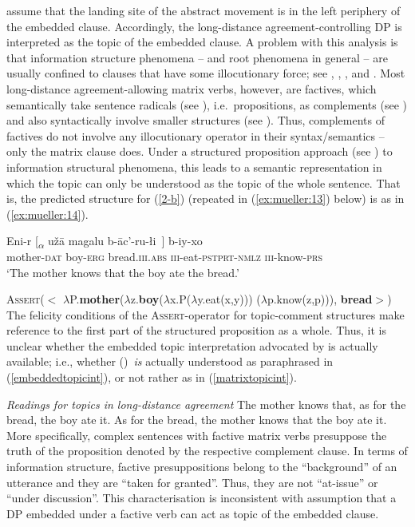 \documentclass[output=paper
,modfonts
,nonflat]{langsci/langscibook}
\begin{document}
\citet{PolinskyPotsdam:01} assume that the landing site of the
abstract movement is in the left periphery of the embedded
	clause. Accordingly, the long-distance agreement-controlling DP is
	interpreted as the topic of the embedded clause. A problem with this
	analysis is that information structure phenomena -- and root phenomena
	in general -- are usually confined to clauses that have some
	illocutionary force; see \citet{HooperThompson:73},
	\citet{Ebertetal08}, \citet{Krifkainprep}, and \citet{Maticetal14}. Most long-distance agreement-allowing
	matrix verbs, however, are factives, which semantically take sentence
	radicals (see \citealt{Stenius67}), i.e.~propositions, as complements (see \citealt{Krifka04})
	and also syntactically involve smaller
	structures (see \citealt{deCubaUrogdi10}). Thus, complements of
	factives do not involve any illocutionary operator in their
	syntax/semantics -- only the matrix clause does. Under a structured
	proposition approach  (see \citealt{Krifka92}) to information structural
	phenomena, this leads to a semantic representation in which the topic
	can only be understood as the topic of the whole sentence. That is,
	the predicted structure for (\ref{2-b})  (repeated in
	(\ref{ex:mueller:13}) below) is as in (\ref{ex:mueller:14}).
	
	
	\ea\label{ex:mueller:13}
	\gll    Eni-r [\textsubscript{{$\alpha$}} u\v{z}\={a} \label{2d-b}magalu b-\={a}c'-ru-\l i~] b-iy-xo \\
	mother-{\scshape dat} {} boy-{\scshape erg} bread.{\scshape iii.abs} {\scshape iii}-eat-{\scshape pstprt-nmlz} {\scshape iii}-know-{\scshape prs} \\
	\glt      `The mother knows that the boy ate the bread.'
	\z
	
	\ea\label{ex:mueller:14} {\scshape Assert}($<$ $\lambda$P.{\bfseries mother}($\lambda$z.{\bfseries boy}($\lambda$x.P($\lambda$y.eat(x,y))) ($\lambda$p.know(z,p))), {\bfseries bread}$>$)\z
	The felicity conditions of the {\scshape Assert}-operator for topic-comment
	structures make reference to the first part of the structured
	proposition as a whole. Thus, it is unclear whether the embedded topic interpretation
	advocated by \cite{PolinskyPotsdam:01}  is actually available;
	i.e.,  whether (\LLast)\ {\itshape is} actually understood as paraphrased in (\ref{embeddedtopicint}), or not rather as in (\ref{matrixtopicint}).
	
	\ea\label{ex:mueller:15} \textit{Readings for topics in long-distance agreement}
	\ea \label{embeddedtopicint}The mother knows that, as for the bread, the boy ate it.
	\ex \label{matrixtopicint}As for the bread, the mother knows that the boy ate it.
	\z
	\z
	More specifically, complex sentences with factive matrix verbs
	presuppose the truth of the proposition denoted by the respective
	complement clause. In terms of information structure, factive
	presuppositions belong to the ``background'' of an utterance and they
	are ``taken for granted''. Thus, they are not ``at-issue'' or ``under
	discussion''. This characterisation is inconsistent with
	 assumption that a DP embedded under a factive verb
	can act as topic of the embedded clause.
	
\end{document}
